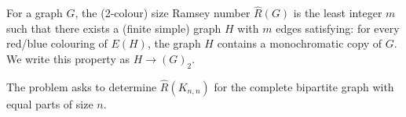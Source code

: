 For a graph $G$, the (2-colour) size Ramsey number $\hat R(G)$ is the least integer $m$ such that there exists a (finite simple) graph $H$ with $m$ edges satisfying:
for every red/blue colouring of $E(H)$, the graph $H$ contains a monochromatic copy of $G$.
We write this property as $H\to (G)_2$.

The problem asks to determine $\hat R(K_{n,n})$ for the complete bipartite graph with equal parts of size $n$.
